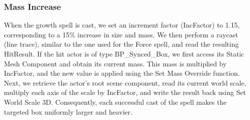 \documentclass[conference]{IEEEtran}
\begin{document}
    \subsubsection{Mass Increase}
    When the growth spell is cast, we set an increment factor (IncFactor) to 1.15, corresponding to a 15\% increase in size and mass. We then perform a raycast (line trace), similar to the one used for the Force spell, and read the resulting HitResult. If the hit actor is of type BP\_Synced\_Box, we first access its Static Mesh Component and obtain its current mass. This mass is multiplied by IncFactor, and the new value is applied using the Set Mass Override function. Next, we retrieve the actor’s root scene component, read its current world scale, multiply each axis of the scale by IncFactor, and write the result back using Set World Scale 3D. Consequently, each successful cast of the spell makes the targeted box uniformly larger and heavier.
\end{document}
